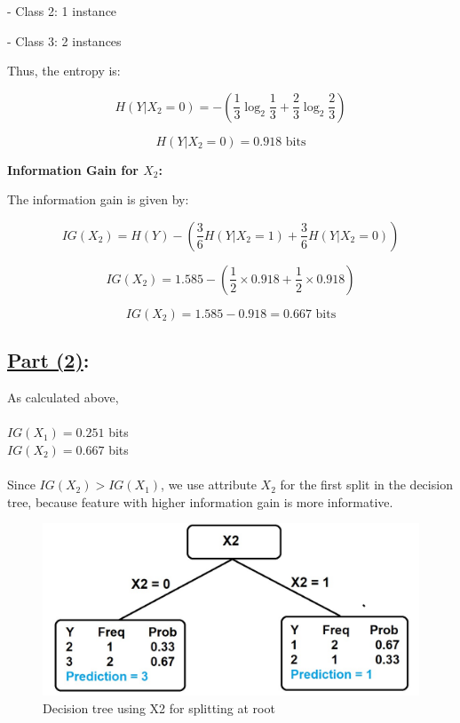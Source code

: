\documentclass[12pt]{article}
\begin{document}
- Class 2: 1 instance

- Class 3: 2 instances

Thus, the entropy is:

\[
  H(Y|X_2 = 0) = -\left( \frac{1}{3} \log_2 \frac{1}{3} + \frac{2}{3} \log_2 \frac{2}{3} \right)
\]

\[
  H(Y|X_2 = 0) = 0.918 \text{ bits}
\]

\textbf{Information Gain for $X_2$:}

The information gain is given by:

\[
  IG(X_2) = H(Y) - \left( \frac{3}{6} H(Y|X_2 = 1) + \frac{3}{6} H(Y|X_2 = 0) \right)
\]

\[
  IG(X_2) = 1.585 - \left( \frac{1}{2} \times 0.918 + \frac{1}{2} \times 0.918 \right)
\]

\[
  IG(X_2) = 1.585 - 0.918 = 0.667 \text{ bits}
\]

\subsection*{\underline{Part (2)}:}
As calculated above,\\\\
$IG(X_1) = 0.251$ bits\\
$IG(X_2) = 0.667$ bits\\\\
Since $IG(X_2) > IG(X_1)$, we use attribute $X_2$ for the first split in the decision tree, because feature with higher information gain is more informative.

\begin{figure}[h!] %
  \centering %
  \includegraphics[width=\textwidth]{tree_image.jpeg} %
  \caption{Decision tree using X2 for splitting at root} %
  \label{fig:your_label} %
\end{figure}
\end{document}
